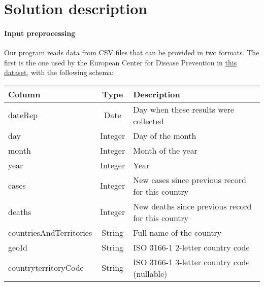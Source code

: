 \section{Solution description}
\label{sec:description}

\paragraph{Input preprocessing}
Our program reads data from CSV files that can be provided in two formats. The first is the one used by the European Center for Disease Prevention in \href{https://www.ecdc.europa.eu/en/publications-data/download-todays-data-geographic-distribution-covid-19-cases-worldwide}{this dataset}, with the following schema:

\begin{center}
    \begin{tabu}{l c X}
        \toprule
        \rowfont{\sffamily\bfseries}
        Column                  & Type    & Description                                                                             \\
        \midrule
        dateRep                 & Date    & Day when these results were collected                                                   \\
        day                     & Integer & Day of the month                                                                        \\
        month                   & Integer & Month of the year                                                                       \\
        year                    & Integer & Year                                                                                    \\
        cases                   & Integer & New cases since previous record for this country                                        \\
        deaths                  & Integer & New deaths since previous record for this country                                       \\
        countriesAndTerritories & String  & Full name of the country                                                                \\
        geoId                   & String  & ISO 3166-1 2-letter country code                                                        \\
        countryterritoryCode    & String  & ISO 3166-1 3-letter country code (nullable)                                             \\

\end{tabu}
\end{center}
